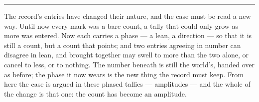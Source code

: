 %
%
%
%
%

\bigskip
\begin{center}
\rule{0.4\textwidth}{0.4pt}
\end{center}
\bigskip

\noindent The record's entries have changed their nature, and the case must be read a new way. Until now every
mark was a bare count, a tally that could only grow as more was entered. Now each carries a phase --- a lean, a
direction --- so that it is still a count, but a count that points; and two entries agreeing in number can
disagree in lean, and brought together may swell to more than the two alone, or cancel to less, or to nothing.
The number beneath is still the world's, handed over as before; the phase it now wears is the new thing the
record must keep. From here the case is argued in these phased tallies --- amplitudes --- and the whole of the
change is that one: the count has become an amplitude.


